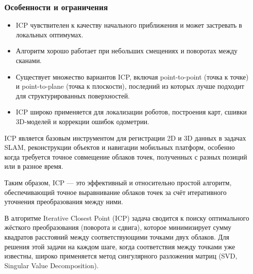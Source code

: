 \subsubsection{Особенности и ограничения}
\begin{itemize}
	\item ICP чувствителен к качеству начального приближения и может застревать в локальных оптимумах.
	\item Алгоритм хорошо работает при небольших смещениях и поворотах между сканами.
	\item Существует множество вариантов ICP, включая point-to-point (точка к точке) и point-to-plane (точка к плоскости), последний из которых лучше подходит для структурированных поверхностей.
	\item ICP широко применяется для локализации роботов, построения карт, сшивки 3D-моделей и коррекции ошибок одометрии.
\end{itemize}

ICP является базовым инструментом для регистрации 2D и 3D данных в задачах SLAM, реконструкции объектов и навигации мобильных платформ, особенно когда требуется точное совмещение облаков точек, полученных с разных позиций или в разное время.

Таким образом, ICP — это эффективный и относительно простой алгоритм, обеспечивающий точное выравнивание облаков точек за счёт итеративного уточнения преобразования между ними.



В алгоритме Iterative Closest Point (ICP) задача сводится к поиску оптимального жёсткого преобразования (поворота и сдвига), которое минимизирует сумму квадратов расстояний между соответствующими точками двух облаков. Для решения этой задачи на каждом шаге, когда соответствия между точками уже известны, широко применяется метод сингулярного разложения матриц (SVD, Singular Value Decomposition).

